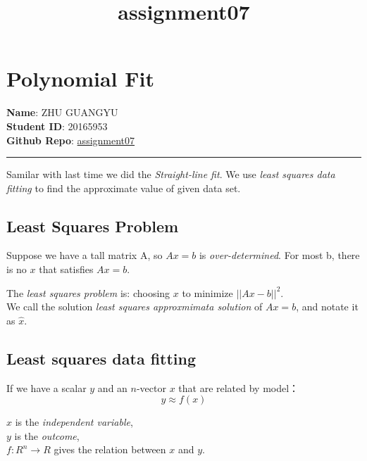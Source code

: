 \documentclass[11pt]{article}
\title{assignment07}
\begin{document}
    
    
    \maketitle
    
    

    
    \section{Polynomial Fit}\label{polynomial-fit}

\textbf{Name}: ZHU GUANGYU\\
\textbf{Student ID}: 20165953\\
\textbf{Github Repo}:
\href{https://github.com/z1ggy-o/cv_assignment/tree/master/assignment07}{assignment07}

\begin{center}\rule{0.5\linewidth}{\linethickness}\end{center}

Samilar with last time we did the \emph{Straight-line fit}. We use
\emph{least squares data fitting} to find the approximate value of given
data set.

\subsection{Least Squares Problem}\label{least-squares-problem}

Suppose we have a tall matrix A, so \(Ax = b\) is
\emph{over-determined}. For most b, there is no \(x\) that satisfies
\(Ax = b\).

The \emph{least squares problem} is: choosing \(x\) to minimize
\(||Ax-b||^2\).\\
We call the solution \emph{least squares approxmimata solution} of
\(Ax=b\), and notate it as \(\hat{x}\).

\subsection{Least squares data
fitting}\label{least-squares-data-fitting}

If we have a scalar \(y\) and an \(n\)-vector \(x\) that are related by
model： \[y \approx f(x)\]

\(x\) is the \emph{independent variable},\\
\(y\) is the \emph{outcome},\\
\(f: R^{n} \rightarrow R\) gives the relation between \(x\) and \(y\).
\end{document}
